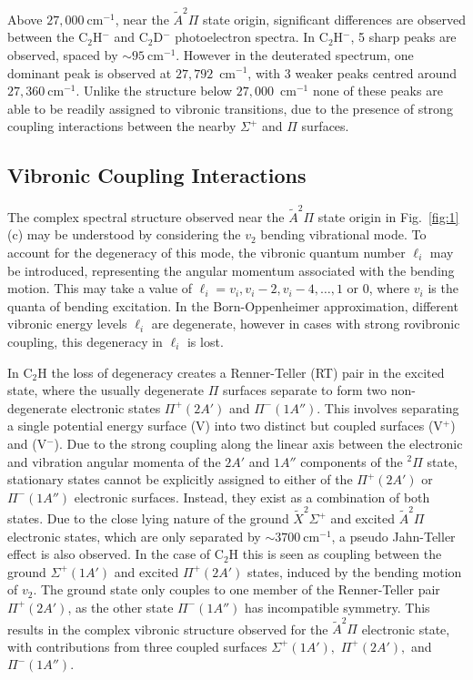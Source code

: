 \documentclass[aip,graphicx]{revtex4-1}
\begin{document}
Above $27,000~$cm$^{-1}$, near the $\tilde{A}^2\Pi$ state origin, significant differences are observed between the C$_2$H$^-$ and C$_2$D$^-$ photoelectron spectra. In C$_2$H$^-$, 5 sharp peaks are observed, spaced by $\sim95~$cm$^{-1}$. However in the deuterated spectrum, one dominant peak is observed at $27,792$~cm$^{-1}$, with 3 weaker peaks centred around $27,360~$cm$^{-1}$. Unlike the structure below $27,000$~cm$^{-1}$ none of these peaks are able to be readily assigned to vibronic transitions, due to the presence of strong coupling interactions between the nearby $\Sigma^+$ and $\Pi$ surfaces.




\subsection{Vibronic Coupling Interactions}
The complex spectral structure observed near the $\tilde{A}^2\Pi$ state origin in Fig.~\ref{fig:1}(c) may be understood by considering the $v_2$ bending vibrational mode. To account for the degeneracy of this mode, the vibronic quantum number $\ell_i$ may be introduced, representing the angular momentum associated with the bending motion. This may take a value of $\ell_i = v_i, v_i-2, v_i-4,\dots,1$ or $0$, where $v_i$ is the quanta of bending excitation. In the Born-Oppenheimer approximation, different vibronic energy levels $\ell_i$ are degenerate, however in cases with strong rovibronic coupling, this degeneracy in $\ell_i$ is lost. 

In C$_2$H the loss of degeneracy creates a Renner-Teller (RT) pair in the excited state, where the usually degenerate $\Pi$ surfaces separate to form two non-degenerate electronic states $\Pi^+ (2A')$ and $\Pi^-(1A'')$. This involves separating a single potential energy surface (V) into two distinct but coupled surfaces (V$^+$) and (V$^-$). Due to the strong coupling along the linear axis between the electronic and vibration angular momenta of the $2A'$ and $1A''$ components of the $^2\Pi$ state, stationary states cannot be explicitly assigned to either of the $\Pi^+(2A')$ or $\Pi^-(1A'')$ electronic surfaces. Instead, they exist as a combination of both states. Due to the close lying nature of the ground {$\tilde{X} ^2\Sigma^+$} and excited {$\tilde{A} ^2\Pi$} electronic states, which are only separated by $\sim3700~$cm$^{-1}$, a pseudo Jahn-Teller effect is also observed. In the case of C$_2$H this is seen as coupling between the ground $\Sigma^+(1A')$ and excited $\Pi^+(2A')$ states, induced by the bending motion of $v_2$. The ground state only couples to one member of the Renner-Teller pair $\Pi^+(2A')$, as the other state $\Pi^-(1A'')$ has incompatible symmetry. This results in the complex vibronic structure observed for the $\tilde{A}^2\Pi$ electronic state, with contributions from three coupled surfaces $\Sigma^+(1A'),$ $\Pi^+(2A'),$ and $\Pi^-(1A'')$.
\end{document}
